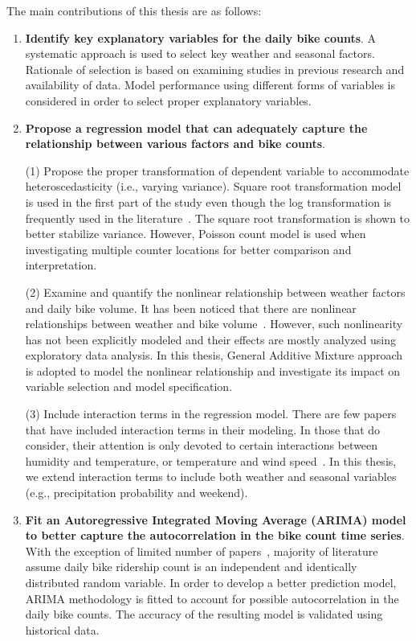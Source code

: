 \documentclass [11pt, proquest] {uwthesis}[2015/03/03]
\begin{document}
The main contributions of this thesis are as follows:
\begin{enumerate}

\item \textbf{Identify key explanatory variables for the daily bike counts}. A systematic approach is used to select key weather and seasonal factors. Rationale of selection is based on examining studies in previous research and availability of data. Model performance using different forms of variables is considered in order to select proper explanatory variables. 


\item \textbf{Propose a regression model that can adequately capture the relationship between various factors and bike counts}. 

(1) Propose the proper transformation of dependent variable to accommodate heteroscedasticity (i.e., varying variance). Square root transformation model is used in the first part of the study even though the log transformation is frequently used in the literature~\cite{Nosal:2014aa,Thomas:2009aa,Ahmed12}. The square root transformation is shown to better stabilize variance. However, Poisson count model is used when investigating multiple counter locations for better comparison and interpretation. 

(2) Examine and quantify the nonlinear relationship between weather factors and daily bike volume. It has been noticed that there are nonlinear relationships between weather and bike volume~\cite{Ahmed12,Miranda-Moreno:2011aa,Thomas12,Lewin:2011aa}. However, such nonlinearity has not been explicitly modeled and their effects are mostly analyzed using exploratory data analysis. In this thesis, General Additive Mixture approach is adopted to model the nonlinear relationship and investigate its impact on variable selection and model specification.

(3) Include interaction terms in the regression model. There are few papers that have included interaction terms in their modeling. In those that do consider, their attention is only devoted to certain interactions between humidity and temperature, or temperature and wind speed~\cite{Miranda-Moreno:2011aa}. In this thesis, we extend interaction terms to include both weather and seasonal variables (e.g., precipitation probability and weekend).

\item \textbf{Fit an Autoregressive Integrated Moving Average (ARIMA) model to better capture the autocorrelation in the bike count time series}. With the exception of limited number of papers~\cite{Gallop:2012aa,Nosal:2014aa}, majority of literature assume daily bike ridership count is an independent and identically distributed random variable. In order to develop a better prediction model, ARIMA methodology is fitted to account for possible autocorrelation in the daily bike counts. The accuracy of the resulting model is validated using historical data.


\end{enumerate}
\end{document}
